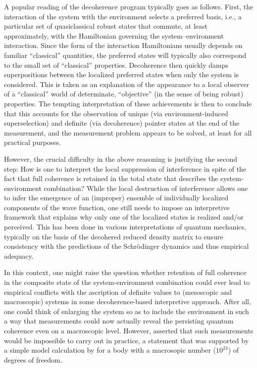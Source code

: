 \documentclass[twocolumn,rmp,aps,amsmath,amsfonts,noshowkeys,noshowpacs]{revtex4}
\begin{document}
A popular reading of the decoherence program typically goes as
follows. First, the interaction of the system with the environment
selects a preferred basis, i.e., a particular set of quasiclassical
robust states that commute, at least approximately, with the
Hamiltonian governing the system--environment interaction.  Since the
form of the interaction Hamiltonians usually depends on familiar
``classical'' quantities, the preferred states will typically also
correspond to the small set of ``classical'' properties.  Decoherence
then quickly damps superpositions between the localized preferred
states when only the system is considered. This is taken as an
explanation of the appearance to a local observer of a ``classical''
world of determinate, ``objective'' (in the sense of being robust)
properties.  The tempting interpretation of these achievements is then
to conclude that this accounts for the observation of unique (via
environment-induced superselection) and definite (via decoherence)
pointer states at the end of the measurement, and the measurement
problem appears to be solved, at least for all practical purposes.

However, the crucial difficulty in the above reasoning is justifying
the second step: How is one to interpret the local suppression of
interference in spite of the fact that full coherence is retained in
the total state that describes the system-environment combination?
While the local destruction of interference allows one to infer the
emergence of an (improper) ensemble of individually localized
components of the wave function, one still needs to impose an
interpretive framework that explains why only one of the localized
states is realized and/or perceived. This has been done in various
interpretations of quantum mechanics, typically on the basis of the
decohered reduced density matrix to ensure consistency with the
predictions of the Schr\"odinger dynamics and thus empirical adequacy.

In this context, one might raise the question whether retention of
full coherence in the composite state of the system-environment
combination could ever lead to empirical conflicts with the ascription
of definite values to (mesoscopic and macroscopic) systems in some
decoherence-based interpretive approach.  After all, one could think
of enlarging the system so as to include the environment in such a way
that measurements could now actually reveal the persisting quantum
coherence even on a macroscopic level.  However, \citet{Zurek:1982:tv}
asserted that such measurements would be impossible to carry out in
practice, a statement that was supported by a simple model calculation
by \citet[p.~356]{Omnes:1992:gy} for a body with a macrosopic number
($10^{24}$) of degrees of freedom.
\end{document}
